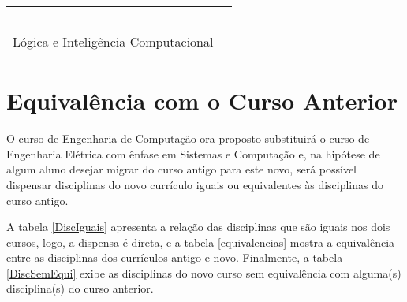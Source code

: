 \begin{table}[ht]
\begin{tabularx}{\textwidth}{| X | l |}
		                                                        & \AnAlg            \\
		                                                        & \EletPadroes      \\
		                                                        & \EletMov          \\
		                                                        & \TeoComp          \\
		                                                        & \ProcImag         \\ \hline
		\multirow{3}{*}{Lógica e Inteligência Computacional}    & \LogProg          \\
		                                                        & \IC               \\
		                                                        & \EletRec          \\
		\hline
	\end{tabularx}
\end{table}




\section{Equivalência com o Curso Anterior}
O curso de Engenharia de Computação ora proposto substituirá o curso de Engenharia Elétrica com ênfase em Sistemas e Computação e, na hipótese de algum aluno desejar migrar do curso antigo para este novo, será possível dispensar disciplinas do novo currículo iguais ou equivalentes às disciplinas do curso antigo.

A tabela \ref{DiscIguais} apresenta a relação das disciplinas que são iguais nos dois cursos, logo, a dispensa é direta, e a tabela \ref{equivalencias} mostra a equivalência entre as disciplinas dos currículos antigo e novo. Finalmente, a tabela \ref{DiscSemEqui} exibe as disciplinas do novo curso sem equivalência com alguma(s) disciplina(s) do curso anterior.

